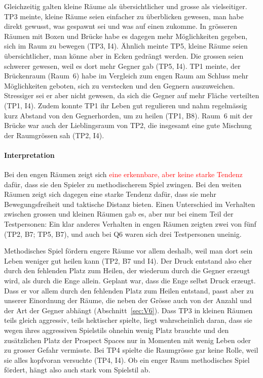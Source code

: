 \documentclass[../Main.tex]{subfiles}
\begin{document}
Gleichzeitig galten kleine Räume als übersichtlicher und grosse als vielseitiger. TP3 meinte, kleine Räume seien einfacher zu überblicken gewesen, man habe direkt gewusst, was gespawnt sei und was auf einen zukomme. In grösseren Räumen mit Boxen und Brücke habe es dagegen mehr Möglichkeiten gegeben, sich im Raum zu bewegen (TP3, I4). Ähnlich meinte TP5, kleine Räume seien übersichtlicher, man könne aber in Ecken gedrängt werden. Die grossen seien schwerer gewesen, weil es dort mehr Gegner gab (TP5, I4). TP1 meinte, der Brückenraum (Raum~6) habe im Vergleich zum engen Raum am Schluss mehr Möglichkeiten geboten, sich zu verstecken und den Gegnern auszuweichen. Stressiger sei er aber nicht gewesen, da sich die Gegner auf mehr Fläche verteilten (TP1, I4). Zudem konnte TP1 ihr Leben gut regulieren und nahm regelmässig kurz Abstand von den Gegnerhorden, um zu heilen (TP1, B8). Raum~6 mit der Brücke war auch der Lieblingsraum von TP2, die insgesamt eine gute Mischung der Raumgrössen sah (TP2, I4).

\paragraph{Interpretation}
Bei den engen Räumen zeigt sich \textcolor{red}{eine erkennbare, aber keine starke Tendenz} dafür, dass sie den Spieler zu methodischerem Spiel zwingen. Bei den weiten Räumen zeigt sich dagegen eine starke Tendenz dafür, dass sie mehr Bewegungsfreiheit und taktische Distanz bieten. Einen Unterschied im Verhalten zwischen grossen und kleinen Räumen gab es, aber nur bei einem Teil der Testpersonen: Ein klar anderes Verhalten in engen Räumen zeigten zwei von fünf (TP2, B7; TP5, B7), und auch bei Q6 waren sich drei Testpersonen uneinig.

Methodisches Spiel fördern engere Räume vor allem deshalb, weil man dort sein Leben weniger gut heilen kann (TP2, B7 und I4). Der Druck entstand also eher durch den fehlenden Platz zum Heilen, der wiederum durch die Gegner erzeugt wird, als durch die Enge allein. Geplant war, dass die Enge selbst Druck erzeugt. Dass er vor allem durch den fehlenden Platz zum Heilen entstand, passt aber zu unserer Einordnung der Räume, die neben der Grösse auch von der Anzahl und der Art der Gegner abhängt (Abschnitt~\ref{sec:V6}). Dass TP3 in kleinen Räumen teils gleich aggressiv, teils hektischer spielte, liegt wahrscheinlich daran, dass sie wegen ihres aggressiven Spielstils ohnehin wenig Platz brauchte und den zusätzlichen Platz der Prospect Spaces nur in Momenten mit wenig Leben oder zu grosser Gefahr vermisste. Bei TP4 spielte die Raumgrösse gar keine Rolle, weil sie alles kopfvoran versuchte (TP4, I4). Ob ein enger Raum methodisches Spiel fördert, hängt also auch stark vom Spielstil ab.
\end{document}

